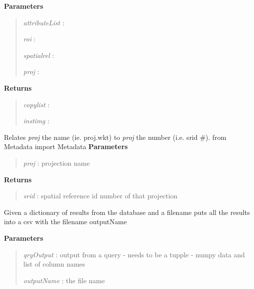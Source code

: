 \documentclass[letterpaper,10pt,english]{sphinxmanual}
\begin{document}
\begin{fulllineitems}
\begin{fulllineitems}
\textbf{Parameters}
\begin{quote}

\emph{attributeList} :

\emph{roi}           :

\emph{spatialrel}    :

\emph{proj}          :
\end{quote}

\textbf{Returns}
\begin{quote}

\emph{copylist}      :

\emph{instimg}       :
\end{quote}

\end{fulllineitems}


\begin{fulllineitems}
\label{code:Database.Database.dbProj}
Relates \emph{proj} the name (ie. proj.wkt) to \emph{proj} the number (i.e. srid \#).
from Metadata import Metadata
\textbf{Parameters}
\begin{quote}

\emph{proj} : projection name
\end{quote}

\textbf{Returns}
\begin{quote}

\emph{srid} : spatial reference id number of that projection
\end{quote}

\end{fulllineitems}


\begin{fulllineitems}
\label{code:Database.Database.exportToCSV}
Given a dictionary of results from the database and a filename puts all the results
into a csv with the filename outputName

\textbf{Parameters}
\begin{quote}

\emph{qryOutput}  : output from a query - needs to be a tupple - numpy data and list of column names

\emph{outputName} : the file name
\end{quote}


\end{fulllineitems}
\end{fulllineitems}
\end{document}
